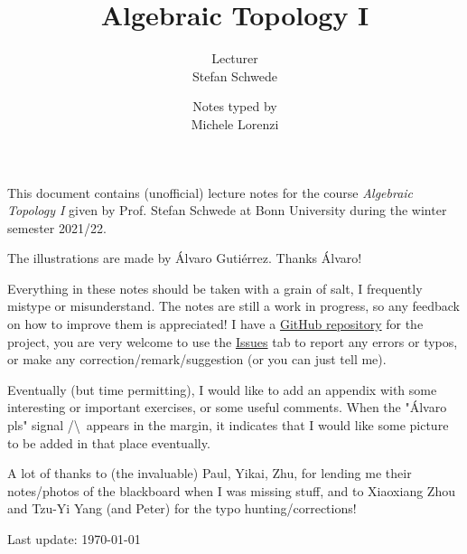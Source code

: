 \documentclass[a4paper, 10pt, oneside, DIV=9, chapterprefix=true, numbers=enddot,bibliography=totoc]{scrbook}
\title{Algebraic Topology I}
\author{{\normalsize Lecturer}\\
	Stefan Schwede}
\date{{\normalsize Notes typed by}\\
	Michele Lorenzi}
\begin{document}
\setlength{\parindent}{0pt}
\setlength{\parskip}{4pt}

\frontmatter
{}
\renewcommand{\thedummy}{\arabic{dummy}}
\maketitle
This document contains (unofficial) lecture notes for the course \emph{Algebraic Topology I} given by Prof. Stefan Schwede at Bonn University during the winter semester 2021/22.

The illustrations are made by \'Alvaro Guti\'errez. Thanks \'Alvaro!

Everything in these notes should be taken with a grain of salt, I frequently mistype or misunderstand. The notes are still a work in progress, so any feedback on how to improve them is appreciated! I have a \href{https://github.com/lrnmhl/AT1}{GitHub repository} for the project, you are very welcome to use the \href{https://github.com/lrnmhl/AT1/issues}{Issues} tab to report any errors or typos, or make any correction/remark/suggestion (or you can just tell me).

Eventually (but time permitting), I would like to add an appendix with some interesting or important exercises, or some useful comments. When the "\'Alvaro pls" signal /\textbackslash\ appears in the margin, it indicates that I would like some picture to be added in that place eventually.

A lot of thanks to (the invaluable) Paul, Yikai, Zhu, for lending me their notes/photos of the blackboard when I was missing stuff, and to Xiaoxiang Zhou and Tzu-Yi Yang (and Peter) for the typo hunting/corrections!

\hrulefill

Last update: \today
	
	
\end{document}
